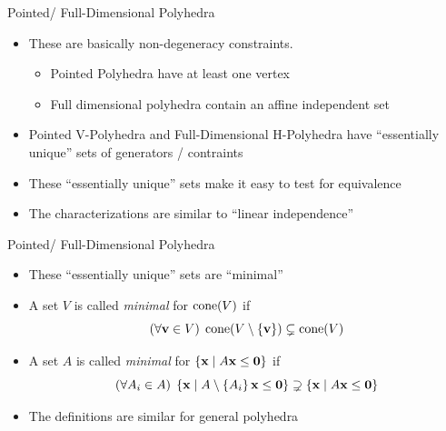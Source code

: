 \documentclass{beamer}
\begin{document}
\begin{frame}{Pointed/ Full-Dimensional Polyhedra}
\begin{itemize}
  \item<1-> These are basically non-degeneracy constraints.
    \begin{itemize}
      \item<2-> Pointed Polyhedra have at least one vertex
      \item<3-> Full dimensional polyhedra contain an affine independent set
    \end{itemize}
  \item<4-> Pointed V-Polyhedra and Full-Dimensional H-Polyhedra have ``essentially unique'' sets of generators / contraints
  \item<5-> These ``essentially unique'' sets make it easy to test for equivalence
  \item<6-> The characterizations are similar to ``linear independence''
\end{itemize}
\end{frame}

\begin{frame}{Pointed/ Full-Dimensional Polyhedra}
\begin{itemize}
  \item<1-> These ``essentially unique'' sets are ``minimal''
  \item<2-> A set $V$ is called \textit{minimal} for $\operatorname{cone}(V)$ if
        \[ (\forall \mathbf{v}\in V)\; \operatorname{cone}(V\setminus\left\{\mathbf{v}\right\}) \subsetneq \operatorname{cone}(V) \]
  \item<3-> A set $A$ is called \textit{minimal} for $\left\{\mathbf{x}\;|\; A\mathbf{x}\leq\mathbf{0}\right\}$ if
        \[ (\forall A_i \in A)\; \left\{\mathbf{x}\;|\; A\setminus\left\{A_i\right\}\mathbf{x}\leq\mathbf{0}\right\} \supsetneq \left\{\mathbf{x}\;|\; A\mathbf{x}\leq\mathbf{0}\right\} \]
  \item<4-> The definitions are similar for general polyhedra
\end{itemize}
\end{frame}

\end{document}
